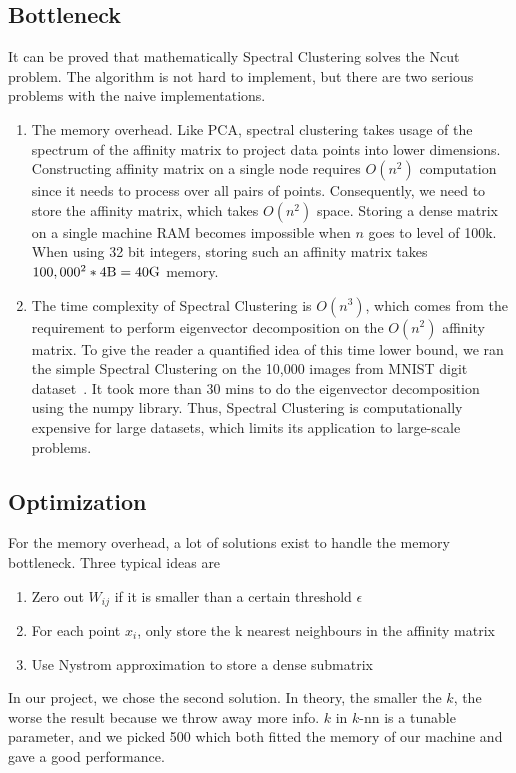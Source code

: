 \documentclass{acm_proc_article-sp}
\begin{document}
\subsection{Bottleneck}
It can be proved that mathematically Spectral Clustering solves the Ncut problem. The algorithm is not hard to implement, but there are two serious problems with the naive implementations.
\begin{enumerate}
\item{The memory overhead. Like PCA, spectral clustering takes usage of the spectrum of the affinity matrix to project data points into lower dimensions. Constructing affinity matrix on a single node requires $O(n^2)$ computation since it needs to process over all pairs of points. Consequently, we need to store the affinity matrix, which takes $O(n^2)$ space. Storing a dense matrix on a single machine RAM becomes impossible when $n$ goes to level of 100k. When using 32 bit integers, storing such an affinity matrix takes $100,000^2 * 4 \textnormal{B} = 40 \textnormal{G}$ memory.
}
\item{The time complexity of Spectral Clustering is $O(n^3)$, which comes from the requirement to perform eigenvector decomposition on the $O(n^2)$ affinity matrix. To give the reader a quantified idea of this time lower bound, we ran the simple Spectral Clustering on the 10,000 images from MNIST digit dataset~\cite{Lichman:2013}. It took more than 30 mins to do the eigenvector decomposition using the numpy library. Thus, Spectral Clustering is computationally expensive for large datasets, which limits its application to large-scale problems.}
\end{enumerate}

\subsection{Optimization}
For the memory overhead, a lot of solutions exist to handle the memory bottleneck. Three typical ideas are
\begin{enumerate}
\item{Zero out $W_{ij}$ if it is smaller than a certain threshold $\epsilon$}
\item{For each point $x_i$, only store the k nearest neighbours in the affinity matrix}
\item{Use Nystrom approximation to store a dense submatrix~\cite{fowlkes2004spectral}}
\end{enumerate}
In our project, we chose the second solution. In theory, the smaller the $k$, the worse the result because we throw away more info. $k$ in $k$-nn is a tunable parameter, and we picked 500 which both fitted the memory of our machine and gave a good performance. 
\end{document}
